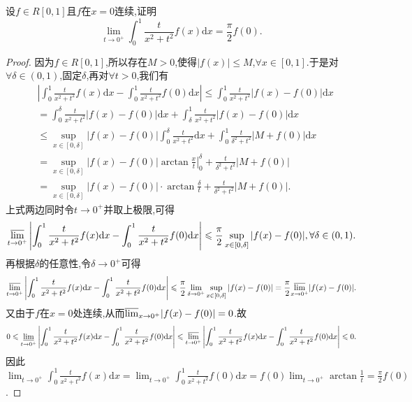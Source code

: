 \documentclass[../../main.tex]{subfiles}%
\begin{document}
\begin{example}[$\,\,$Possion核]\label{example:Possion核}
设\(f\in R[0,1]\)且\(f\)在\(x = 0\)连续,证明
\[
\lim_{t\rightarrow 0^+} \int_0^1{\frac{t}{x^2+t^2}f(x)\mathrm{d}x}=\frac{\pi}{2}f(0).
\]
\end{example}
\begin{proof}
因为\(f\in R[0,1]\),所以存在\(M > 0\),使得\(\vert f(x)\vert\leqslant M\),\(\forall x\in [0,1]\).于是对\(\forall\delta\in(0,1)\),固定\(\delta\),再对\(\forall t > 0\),我们有
\begin{align*}
&\left|\int_0^1\frac{t}{x^2 + t^2}f(x)\mathrm{d}x - \int_0^1\frac{t}{x^2 + t^2}f(0)\mathrm{d}x\right| \leqslant \int_0^1\frac{t}{x^2 + t^2}\vert f(x) - f(0)\vert \mathrm{d}x\\
&= \int_0^{\delta}\frac{t}{x^2 + t^2}\vert f(x) - f(0)\vert \mathrm{d}x + \int_{\delta}^1\frac{t}{x^2 + t^2}\vert f(x) - f(0)\vert \mathrm{d}x\\
&\leqslant \sup_{x\in[0,\delta]}\vert f(x) - f(0)\vert\int_0^{\delta}\frac{t}{x^2 + t^2}\mathrm{d}x + \int_0^1\frac{t}{\delta^2 + t^2}\vert M + f(0)\vert \mathrm{d}x\\
&= \sup_{x\in[0,\delta]}\vert f(x) - f(0)\vert\left.\arctan\frac{x}{t}\right|_{0}^{\delta} + \frac{t}{\delta^2 + t^2}\vert M + f(0)\vert\\
&= \sup_{x\in[0,\delta]}\vert f(x) - f(0)\vert\cdot\arctan\frac{\delta}{t} + \frac{t}{\delta^2 + t^2}\vert M + f(0)\vert.
\end{align*}
上式两边同时令\(t\rightarrow 0^+\)并取上极限,可得
\[
{\varlimsup_{t\rightarrow 0^+}}\left|\int_0^1\frac{t}{x^2 + t^2}f(x)\mathrm{d}x - \int_0^1\frac{t}{x^2 + t^2}f(0)\mathrm{d}x\right| \leqslant \frac{\pi}{2}\sup_{x\in[0,\delta]}\vert f(x) - f(0)\vert, \forall\delta\in(0,1).
\]
再根据\(\delta\)的任意性,令\(\delta\rightarrow 0^+\)可得
\[
{\varlimsup_{t\rightarrow 0^+}}\left|\int_0^1\frac{t}{x^2 + t^2}f(x)\mathrm{d}x - \int_0^1\frac{t}{x^2 + t^2}f(0)\mathrm{d}x\right| \leqslant \frac{\pi}{2}\lim_{\delta\rightarrow 0^+}\sup_{x\in[0,\delta]}\vert f(x) - f(0)\vert = \frac{\pi}{2}{\varlimsup_{x\rightarrow 0^+}}\vert f(x) - f(0)\vert.
\]
又由于\(f\)在\(x = 0\)处连续,从而\({\varlimsup_{x\rightarrow 0^+}}\vert f(x) - f(0)\vert = 0\).故
\[
0\leqslant \underset{t\rightarrow 0^+}{{\varliminf }}\left| \int_0^1{\frac{t}{x^2+t^2}f(x)\mathrm{d}x}-\int_0^1{\frac{t}{x^2+t^2}f(0)\mathrm{d}x} \right|\leqslant {\varlimsup_{t\rightarrow 0^+} }\left| \int_0^1{\frac{t}{x^2+t^2}f(x)\mathrm{d}x}-\int_0^1{\frac{t}{x^2+t^2}f(0)\mathrm{d}x} \right|\leqslant 0.
\]
因此\(\lim_{t\rightarrow 0^+}\int_0^1\frac{t}{x^2 + t^2}f(x)\mathrm{d}x = \lim_{t\rightarrow 0^+}\int_0^1\frac{t}{x^2 + t^2}f(0)\mathrm{d}x = f(0)\lim_{t\rightarrow 0^+}\arctan\frac{1}{t} = \frac{\pi}{2}f(0)\).
\end{proof}
\end{document}
